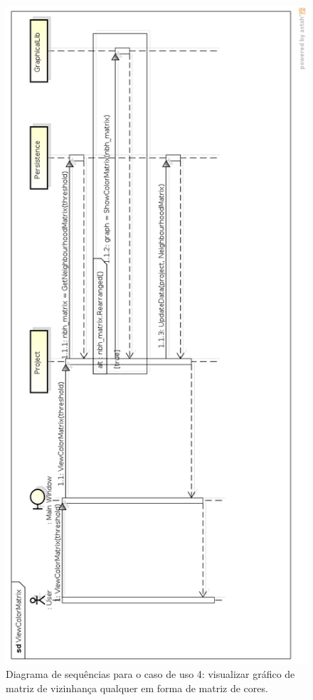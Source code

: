 \begin{figure}
\centering
\includegraphics[scale=0.43]{view-color-matrix}
\caption{Diagrama de sequências para o caso de uso 4: visualizar gráfico de matriz de vizinhança qualquer em forma de matriz de cores.}
\label{fig:view-color-matrix}
\end{figure}

